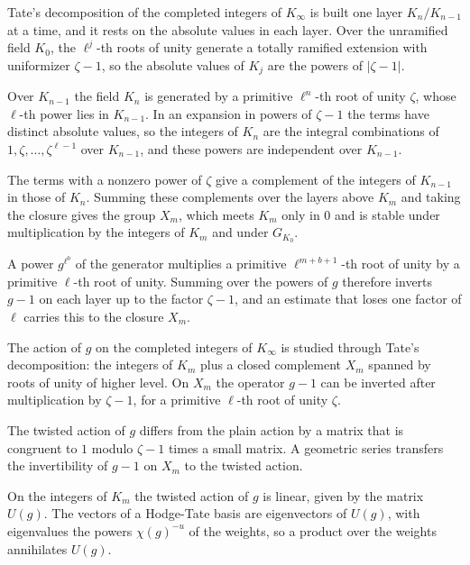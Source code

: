 Tate's decomposition of the completed integers of $K_\infty$ is built one layer
$K_n/K_{n-1}$ at a time, and it rests on the absolute values in each layer.
Over the unramified field $K_0$, the $\ell^j$-th roots of unity generate a
totally ramified extension with uniformizer $\zeta-1$, so the absolute values of
$K_j$ are the powers of $|\zeta-1|$.

Over $K_{n-1}$ the field $K_n$ is generated by a primitive $\ell^n$-th root of
unity $\zeta$, whose $\ell$-th power lies in $K_{n-1}$. In an expansion in
powers of $\zeta-1$ the terms have distinct absolute values, so the integers of
$K_n$ are the integral combinations of $1,\zeta,\ldots,\zeta^{\ell-1}$ over
$K_{n-1}$, and these powers are independent over $K_{n-1}$.

The terms with a nonzero power of $\zeta$ give a complement of the integers of
$K_{n-1}$ in those of $K_n$. Summing these complements over the layers above
$K_m$ and taking the closure gives the group $X_m$, which meets $K_m$ only in $0$
and is stable under multiplication by the integers of $K_m$ and under $G_{K_0}$.

A power $g^{\ell^b}$ of the generator multiplies a primitive
$\ell^{m+b+1}$-th root of unity by a primitive $\ell$-th root of unity. Summing
over the powers of $g$ therefore inverts $g-1$ on each layer up to the factor
$\zeta-1$, and an estimate that loses one factor of $\ell$ carries this to the
closure $X_m$.

The action of $g$ on the completed integers of $K_\infty$ is studied through
Tate's decomposition: the integers of $K_m$ plus a closed complement $X_m$
spanned by roots of unity of higher level. On $X_m$ the operator $g-1$ can be
inverted after multiplication by $\zeta-1$, for a primitive $\ell$-th root of
unity $\zeta$.

The twisted action of $g$ differs from the plain action by a matrix that is
congruent to $1$ modulo $\zeta-1$ times a small matrix. A geometric series
transfers the invertibility of $g-1$ on $X_m$ to the twisted action.

On the integers of $K_m$ the twisted action of $g$ is linear, given by the
matrix $U(g)$. The vectors of a Hodge-Tate basis are eigenvectors of $U(g)$,
with eigenvalues the powers $\chi(g)^{-u}$ of the weights, so a product over the
weights annihilates $U(g)$.

